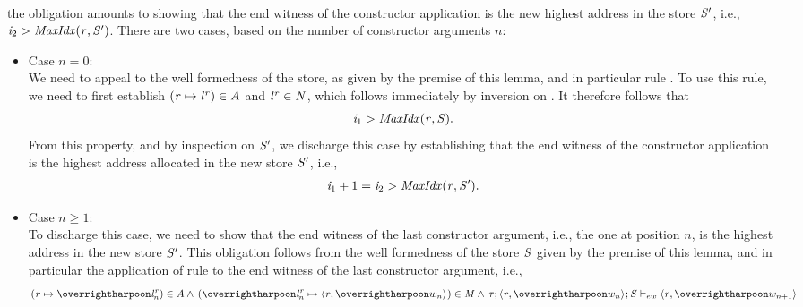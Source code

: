\begin{nproof}
\begin{bcase}
\begin{itemize}
\begin{itemize}
\begin{align*}
    \end{align*}
    the obligation amounts to showing that the end witness of the
    constructor application is the new highest address in the store
    $\mathit{S}'$, i.e., $\mathit{i}_2 > \mathit{MaxIdx}(\mathit{r},\mathit{S}')$.
    There are two cases, based on the number of constructor arguments $n$:
      \begin{itemize}
      \item Case $n = 0$:\\
      We need to appeal to the well formedness of the store, as given by the premise of this lemma,
      and in particular rule .
      To use  this rule, we need to first establish
      $(\mathit{r} \mapsto {\mathit{l}}^{\mathit{r}}) \in A$ and ${\mathit{l}}^{\mathit{r}} \in \mathit{N}$,
      which follows immediately by inversion on \tdatacon{}.
      It therefore follows that
      \begin{align*}
      \mathit{i}_1 > \mathit{MaxIdx}(\mathit{r},\mathit{S}).
      \end{align*}
      From this property, and by inspection on $\mathit{S}'$, we discharge
      this case by establishing that the end witness of the constructor
      application is the highest address allocated in the new store $\mathit{S}'$, i.e.,
      \begin{align*}
      \mathit{i}_1+1 = \mathit{i}_2 > \mathit{MaxIdx}(\mathit{r},\mathit{S}').
      \end{align*}
      \item Case $n \geq 1$:\\
      To discharge this case, we need to show that the end witness of the
      last constructor argument, i.e., the one at position $n$,
      is the highest address in the new store $\mathit{S}'$.
      This obligation follows from the well formedness of the
      store $\mathit{S}$ given by the premise of this lemma, and
      in particular the application of rule
      to the end witness of the last constructor argument, i.e.,
      \begin{align*}
      (\reg \mapsto \overharpoon{\locreg{\loc}{\reg}_n}) \in A \wedge
    \, (\overharpoon{\locreg{\loc}{\reg}_n} \mapsto \concreteloc{\reg}{\overharpoon{w_n}}{}) \in \MENV \wedge
    \, \ewitness{\TYP}{\concreteloc{\reg}{\overharpoon{w_n}}{}}{\STOR}{\concreteloc{\reg}{\overharpoon{w_{n+1}}}{}}

\end{align*}
\end{itemize}
\end{itemize}
\end{itemize}
\end{bcase}
\end{nproof}
